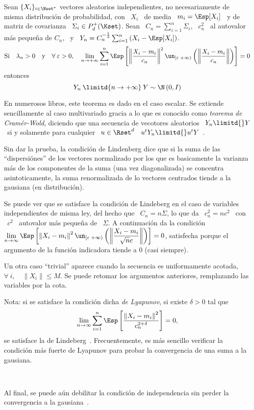 \begin{teorema}\label{Teo:MP:LindenbergFeller}
%
  Sean  $\{  X_i \}_{i  \in  \Nset^*}$  vectores  aleatorios independientes,  no
  necesariamente de misma distribuci\'on de probabilidad, con \ $X_i$ \ de media
  \ $m_i = \Esp[X_i]$ \ y de matriz de covarianza \ $\Sigma_i \in P_d^+(\Kset)$.
  Sean \ $C_n = \sum_{i=1}^n \Sigma_i$, \ $c_n^2$ \ al autovalor m\'as peque\~na
  de $C_n$,  \ y  \ $Y_n  = C_n^{-\frac12} \sum_{i=1}^n  \left( X_i  - \Esp[X_i]
  \right)$.
  \[
  \mbox{Si} \quad \lambda_n > 0 \quad \mbox{y} \quad \forall \: \varepsilon > 0,
  \quad  \lim_{n  \to  +\infty}  \sum_{i=1}^n  \Esp\left[  \left\|  \frac{X_i  -
        m_i}{c_n} \right\|^2  \un_{\left[ \varepsilon \;  +\infty \right)}\left(
      \left\| \frac{X_i - m_i}{c_n} \right\| \right) \right] = 0
  \]
  entonces
  \[
  Y_n \: \limitd{n \to +\infty} \: Y \sim \N\left( 0 , I \right)
  \]
\end{teorema}
%
En  numerosos libros,  este teorema  es  dado en  el caso  escalar. Se  extiende
sencillamente al caso multivariado gracia a lo que es conocido como {\it teorema
  de Cram\'er-Wold}, diciendo  que una secuencia de vecotores  aleatorios \ $Y_n
\limitd{}  Y$ \  si y  solamente para  cualquier \  $u \in  \Rset^d$ \  $u^t Y_n
\limitd{} u^t Y$~\cite{AshDol99, AthLah06, Bil12}.

Sin dar  la prueba,  la condici\'on  de Lindenberg dice  que si  la suma  de las
``dispersi\'ones'' de  los vectores  normalizado por los  que es  basicamente la
varianza  m\'as  de  los componentes  de  la  suma  (una vez  diagonalizada)  se
concentra asintoticamente, la suma renormalizada de lo vectores centrados tiende
a la gausiana (en distribuci\'on).

Se  puede ver  que  se  satisface la  condici\'on  de Lindeberg  en  el caso  de
variables independientes de misma ley, del hecho  que \ $C_n = n \Sigma$, lo que
da \ $c_n^2 = n c^2$ \ con  \ $c^2$ \ autovalor m\'as peque\~na de \ $\Sigma$. A
continuaci\'on da la condici\'on \ $\displaystyle \lim_{n \to \infty} \Esp\left[
  \left\| X_i - m_i \right\|^2 \un_{\left[ \varepsilon \; +\infty \right)}\left(
    \left\|  \frac{X_i  -  m_i}{\sqrt{n}  c}  \right\|  \right)  \right]  =  0$,
satisfecha  porque el  argumento de  la funci\'on  indicadora tiende  a  0 (casi
siempre).

Un otra caso  ``trivial'' aparece cuando la secuencia  es uniformamente acotada,
\ie \  $\forall \: i, \quad  \| X_i \| \le  M$. Se puede  retomar los argumentos
anteriores, remplazando las variables por la cota.

Nota: si se satisface la condici\'on  dicha {\it de Lyapunov}, si existe $\delta
> 0$ tal que
%
\[
\lim_{n   \to  \infty}   \sum_{i=1}^n   \Esp\left[  \frac{\left\|   X_i  -   m_i
    \right\|^2}{c_n^{2+\delta}} \right] = 0,
\]
%
se satisface la de  Lindeberg~\cite{AshDol99}. Frecuentemente, es m\'as sencillo
verificar la condici\'on m\'as fuerte de Lyapunov para probar la convergencia de
una suma a la gausiana.

\

Al final, se puede a\'un debilitar la condici\'on de independencia sin perder la
convergencia a la gausiana~\cite[Sec.~6.4]{BroDav87}.
